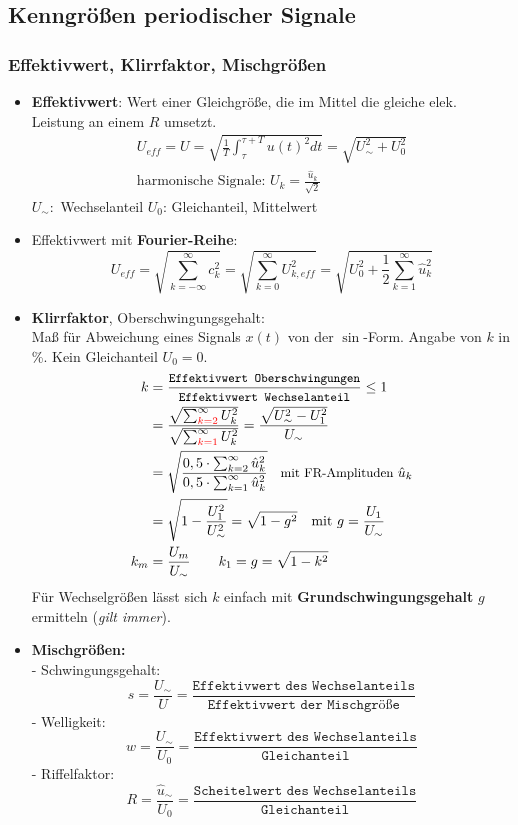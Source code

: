 \begin{multicols*}{2}


\newpage
\subsection{Kenngrößen periodischer Signale}
\subsubsection{Effektivwert, Klirrfaktor, Mischgrößen}
\begin{itemize}
	\item \textbf{Effektivwert}:
	{\small Wert einer Gleichgröße, die im Mittel die gleiche elek. Leistung an einem $R$ umsetzt.}
\begin{gather*}
		      U_{\mathit{eff}} = U = \sqrt{\frac{1}{T} \int_\tau^{\tau+T} u(t)^2 dt} = \sqrt{U_{\sim}^2+U_{0}^2}\\
		      \text{harmonische Signale: }U_k = \frac{\hat{u}_k}{\sqrt{2}}
\end{gather*}
$U_\sim:$ Wechselanteil \quad $U_0$: Gleichanteil, Mittelwert
 	\item Effektivwert mit \textbf{Fourier-Reihe}:\\
		  $$ U_{\mathit{eff}} = \sqrt{\sum_{k=-\infty}^{\infty} c_k^2} = \sqrt{\sum_{k=0}^{\infty}U_{k,\mathit{eff}}^2} = \sqrt{U_0^2 + \frac{1}{2} \sum_{k=1}^{\infty} \hat{u}_k^2}$$
	\item \textbf{Klirrfaktor}, Oberschwingungsgehalt:\\
	      {\small Maß für Abweichung eines Signals $x(t)$ von der $\sin$-Form. Angabe von $k$ in \%. Kein Gleichanteil $U_0=0$.}
	      \begin{align*}
		      k & = \frac{\texttt{\small Effektivwert  Oberschwingungen}}{\texttt{\small Effektivwert Wechselanteil}}\leq 1\\
		        & = \frac{\sqrt{\sum_{{\color{red}{k=2}}}^{\infty} U_{k}^{2}}}{\sqrt{\sum_{{\color{red}{k=1}}}^{\infty} U_{k}^{2}}} = \frac{\sqrt{U_\sim^2 - U_1^2}}{U_\sim} \\
		        & = \sqrt{\frac{0,5 \cdot \sum_{k=2}^{\infty}\hat{u}_k^2}{0,5 \cdot \sum_{k=1}^{\infty}\hat{u}_k^2}} \text{\small \quad mit FR-Amplituden } \hat{u}_k\\
		        & = \sqrt{1-\frac{U_1^2}{U_\sim^2}} = \sqrt{1-g^2} \quad \text{mit } g = \frac{U_1}{U_\sim}\\
		      k_m &= \frac{U_m}{U_\sim} \qquad k_1 = g = \sqrt{1-k^2}
	      \end{align*}
{\small Für Wechselgrößen lässt sich $k$ einfach mit \textbf{Grundschwingungsgehalt} $g$ ermitteln (\textit{gilt immer}).}
	\item \textbf{Mischgrößen:}\\
	      - Schwingungsgehalt:
	      \[
		      s = \frac{U_\sim}{U} = \frac{\texttt{Effektivwert des Wechselanteils}}{\texttt{Effektivwert der Mischgröße}}
	      \]
	      - Welligkeit:
	      \[
		      w = \frac{U_\sim}{U_0} = \frac{\texttt{Effektivwert des Wechselanteils}}{\texttt{Gleichanteil}}
	      \]
	      - Riffelfaktor:
	      \[
		      R = \frac{\hat{u}_\sim}{U_0} = \frac{\texttt{Scheitelwert des Wechselanteils}}{\texttt{Gleichanteil}}
	      \]
\end{itemize}

\end{multicols*}
